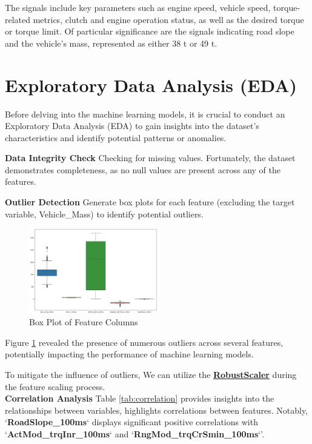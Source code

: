 \documentclass[conference]{IEEEtran}
\begin{document}
The signals include key parameters such as engine speed, vehicle speed, torque-related metrics, clutch and engine operation status, as well as the desired torque or torque limit. Of particular significance are the signals indicating road slope and the vehicle's mass, represented as either 38 t or 49 t.


\section{Exploratory Data Analysis (EDA)}
Before delving into the machine learning models, it is crucial to conduct an Exploratory Data Analysis (EDA) to gain insights into the dataset's characteristics and identify potential patterns or anomalies. 

\noindent \textbf{Data Integrity Check} \hspace{0.2em} Checking for missing values. Fortunately, the dataset demonstrates completeness, as no null values are present across any of the features.

\noindent \textbf{Outlier Detection} \hspace{0.2em} Generate box plots for each feature (excluding the target variable, Vehicle\_Mass) to identify potential outliers. 

\begin{figure}[h]
    \centering
    \includegraphics[width=0.5\textwidth]{Boxplot.png}
    \caption{Box Plot of Feature Columns }
    \label{boxplot}
\end{figure}

Figure \ref{boxplot} revealed the presence of numerous outliers across several features, potentially impacting the performance of machine learning models.

To mitigate the influence of outliers, We can utilize the \href{https://scikit-learn.org/stable/modules/generated/sklearn.preprocessing.RobustScaler.html}{\textbf{RobustScaler}} during the feature scaling process. \\

\noindent \textbf{Correlation Analysis} \hspace{0.2em} Table \ref{tab:correlation} provides insights into the relationships between variables, highlights correlations between features. Notably, `\textbf{RoadSlope\_100ms}` displays significant positive correlations with `\textbf{ActMod\_trqInr\_100ms}` and `\textbf{RngMod\_trqCrSmin\_100ms}`'.
\end{document}
